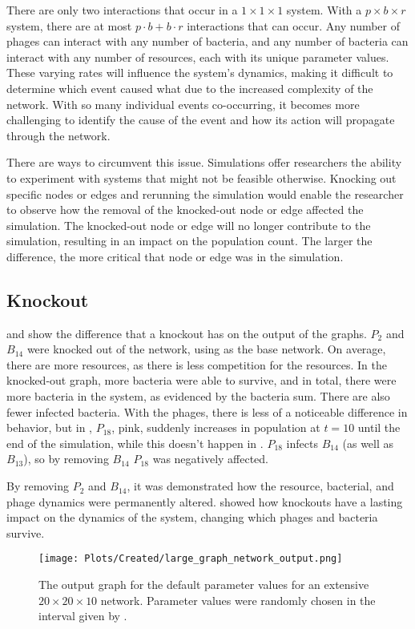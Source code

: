 There are only two interactions that occur in a $1\times1\times1$ system. 
With a $p\times b\times r$ system, there are at most $p\cdot b + b\cdot r$ interactions that can occur. 
Any number of phages can interact with any number of bacteria, and any number of bacteria can interact with any number of resources, each with its unique parameter values. 
These varying rates will influence the system's dynamics, making it difficult to determine which event caused what due to the increased complexity of the network. 
With so many individual events co-occurring, it becomes more challenging to identify the cause of the event and how its action will propagate through the network. 

There are ways to circumvent this issue. 
Simulations offer researchers the ability to experiment with systems that might not be feasible otherwise. 
Knocking out specific nodes or edges and rerunning the simulation would enable the researcher to observe how the removal of the knocked-out node or edge affected the simulation. 
The knocked-out node or edge will no longer contribute to the simulation, resulting in an impact on the population count. 
The larger the difference, the more critical that node or edge was in the simulation. 

\subsection{Knockout}
 and 
show the difference that a knockout has on the output of the graphs. 
$P_2$ and $B_{14}$ were knocked out of the network, using  as the base network. 
On average, there are more resources, as there is less competition for the resources. 
In the knocked-out graph, more bacteria were able to survive, and in total, there were more bacteria in the system, as evidenced by the bacteria sum. 
There are also fewer infected bacteria. 
With the phages, there is less of a noticeable difference in behavior, but in , $P_{18}$, pink, suddenly increases in population at $t=10$ until the end of the simulation, while this doesn't happen in . 
$P_{18}$ infects $B_{14}$ (as well as $B_13$), so by removing $B_{14}$ $P_{18}$ was negatively affected. 

By removing $P_2$ and $B_{14}$, it was demonstrated how the resource, bacterial, and phage dynamics were permanently altered. 
 showed how knockouts have a lasting impact on the dynamics of the system, changing which phages and bacteria survive. 
\begin{figure}
    \texttt{[image: Plots/Created/large\_graph\_network\_output.png]}
    \centering
    \caption{
        The output graph for the default parameter values for an extensive $20\times 20 \times 10$ network. 
        Parameter values were randomly chosen in the interval given by . 
    }
    \label{fig:created:large_graph_network_output}
\end{figure}

